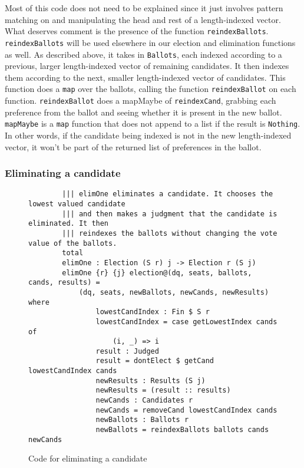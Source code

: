Most of this code does not need to be explained since it just involves pattern
matching on and manipulating the head and rest of a length-indexed vector. What
deserves comment is the presence of the function \texttt{reindexBallots}.
\texttt{reindexBallots} will be used elsewhere in our election and elimination
functions as well. As described above, it takes in \texttt{Ballots}, each
indexed according to a previous, larger length-indexed vector of remaining
candidates. It then indexes them according to the next, smaller length-indexed
vector of candidates. This function does a \texttt{map} over the ballots,
calling the function \texttt{reindexBallot} on each function.
\texttt{reindexBallot} does a mapMaybe of \texttt{reindexCand}, grabbing each
preference from the ballot and seeing whether it is present in the new ballot.
\texttt{mapMaybe} is a \texttt{map} function that does not append to a list if
the result is \texttt{Nothing}. In other words, if the candidate being indexed
is not in the new length-indexed vector, it won't be part of the returned list
of preferences in the ballot. 

\subsubsection{Eliminating a candidate}

\begin{figure}[ht!!!!!!!!]
	\caption{Code for eliminating a candidate}
	\label{elim_cand_code}
    \begin{lstlisting}
        ||| elimOne eliminates a candidate. It chooses the lowest valued candidate
        ||| and then makes a judgment that the candidate is eliminated. It then
        ||| reindexes the ballots without changing the vote value of the ballots. 
        total
        elimOne : Election (S r) j -> Election r (S j)
        elimOne {r} {j} election@(dq, seats, ballots, cands, results) = 
            (dq, seats, newBallots, newCands, newResults) where
                lowestCandIndex : Fin $ S r
                lowestCandIndex = case getLowestIndex cands of
                    (i, _) => i
                result : Judged
                result = dontElect $ getCand lowestCandIndex cands
                newResults : Results (S j)
                newResults = (result :: results)
                newCands : Candidates r
                newCands = removeCand lowestCandIndex cands
                newBallots : Ballots r
                newBallots = reindexBallots ballots cands newCands
    \end{lstlisting}
\end{figure}


